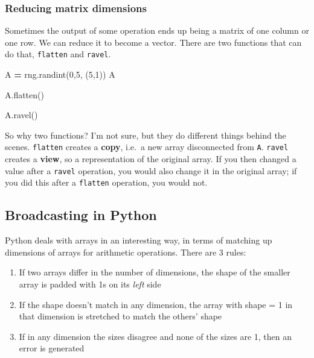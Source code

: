 \documentclass[
  letterpaper,
]{scrbook}
\newenvironment{Shaded}{\begin{snugshade}}{\end{snugshade}}
\newcommand{\DecValTok}[1]{\textcolor[rgb]{0.00,0.00,0.81}{#1}}
\newcommand{\NormalTok}[1]{#1}
\newcommand{\OperatorTok}[1]{\textcolor[rgb]{0.81,0.36,0.00}{\textbf{#1}}}
\providecommand{\tightlist}{%
  \setlength{\itemsep}{0pt}\setlength{\parskip}{0pt}}
\begin{document}
\hypertarget{reducing-matrix-dimensions}{%
\subsubsection{Reducing matrix dimensions}\label{reducing-matrix-dimensions}}

Sometimes the output of some operation ends up being a matrix of one column or one row. We can reduce it to become a vector. There are two functions that can do that, \texttt{flatten} and \texttt{ravel}.

\begin{Shaded}
\begin{Highlighting}[]
\NormalTok{A }\OperatorTok{=}\NormalTok{ rng.randint(}\DecValTok{0}\NormalTok{,}\DecValTok{5}\NormalTok{, (}\DecValTok{5}\NormalTok{,}\DecValTok{1}\NormalTok{))}
\NormalTok{A}
\end{Highlighting}
\end{Shaded}

\begin{Shaded}
\begin{Highlighting}[]
\NormalTok{A.flatten()}
\end{Highlighting}
\end{Shaded}

\begin{Shaded}
\begin{Highlighting}[]
\NormalTok{A.ravel()}
\end{Highlighting}
\end{Shaded}

So why two functions? I'm not sure, but they do different things behind the scenes. \texttt{flatten} creates a \textbf{copy}, i.e.~a new array disconnected from \texttt{A}. \texttt{ravel} creates a \textbf{view}, so a representation of the original array. If you then changed a value after a \texttt{ravel} operation, you would also change it in the original array; if you did this after a \texttt{flatten} operation, you would not.

\hypertarget{broadcasting-in-python}{%
\subsection{Broadcasting in Python}\label{broadcasting-in-python}}

Python deals with arrays in an interesting way, in terms of matching up dimensions of arrays for arithmetic operations. There are 3 rules:

\begin{enumerate}
\def\labelenumi{\arabic{enumi}.}
\tightlist
\item
  If two arrays differ in the number of dimensions, the shape of the smaller array is padded with 1s on its \emph{left} side
\item
  If the shape doesn't match in any dimension, the array with shape = 1 in that dimension is stretched to match the others' shape
\item
  If in any dimension the sizes disagree and none of the sizes are 1, then an error is generated
\end{enumerate}
\end{document}
